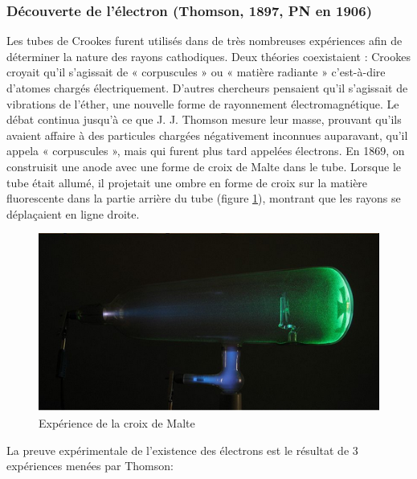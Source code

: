 \subsubsection{Découverte de l'électron (Thomson, 1897, PN en 1906)}

Les tubes de Crookes furent utilisés dans de très nombreuses expériences afin de déterminer la nature des rayons cathodiques. Deux théories coexistaient : Crookes croyait qu'il s'agissait de « corpuscules » ou « matière radiante » c'est-à-dire d'atomes chargés électriquement. D'autres chercheurs pensaient qu'il s'agissait de vibrations de l'éther, une nouvelle forme de rayonnement électromagnétique. Le débat continua jusqu'à ce que J. J. Thomson mesure leur masse, prouvant qu'ils avaient affaire à des particules chargées négativement inconnues auparavant, qu'il appela « corpuscules », mais qui furent plus tard appelées électrons. En 1869, on construisit une anode avec une forme de croix de Malte dans le tube. Lorsque le tube était allumé, il projetait une ombre en forme de croix sur la matière fluorescente dans la partie arrière du tube (figure \ref{fig:croix_de_malte}), montrant que les rayons se déplaçaient en ligne droite. 

\begin{figure}[ht]
    \centering
    \includegraphics[scale=0.60]{Images1/croixmalte.PNG}
    \caption{Expérience de la croix de Malte}
    \label{fig:croix_de_malte}
\end{figure}

La preuve expérimentale de l'existence des électrons est le résultat de 3 expériences menées par Thomson: 

